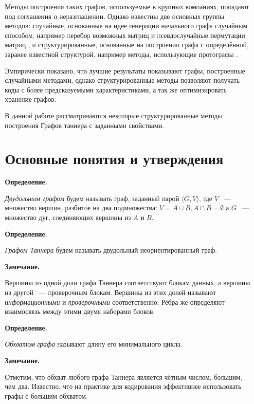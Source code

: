 \documentclass[14pt]{mmcs-article}
\begin{document}
Методы построения таких графов, используемые в крупных компаниях, попадают под соглашения о неразглашении. Однако известны две основных группы методов: случайные, основанные на идее генерации начального графа случайным способом, например перебор возможных матриц \cite{bruteforce} и псевдослучайные пермутации матриц \cite{gallager}, и структурированные, основанные на построении графа с определённой, заранее известной структурой, например методы, использующие протографы \cite{protographs}.

Эмпирически показано, что лучшие результаты показывают графы, построенные случайными методами, однако структурированные методы позволяют получать коды с более предсказуемыми характеристиками, а так же оптимизировать хранение графов. 

В данной работе рассматриваются некоторые структурированные методы построения Графов таннера с заданными свойствами.

\newpage
\section{Основные понятия и утверждения}\label{dsfs}

\textbf{Определение.}

\textsl{Двудольным графом} будем называть граф, заданный парой $\langle G, V \rangle$, где $V$ ~--- множество вершин, разбитое на два подмножества: $V = A \cup B, A \cap B = \emptyset$ а $G$ ~--- множество дуг, соединяющих вершины из $A$ и $B$.

\textbf{Определение.}

\textsl{Графом Таннера} будем называть двудольный неориентированный граф.

\textbf{Замечание.}

Вершины из одной доли графа Таннера соответствуют блокам данных, а вершины из другой ~--- проверочным блокам. Вершины из этих долей называют \textsl{информационными} и \textsl{проверочными} соответственно. Рёбра же определяют взаимосвязь между этими двумя наборами блоков.

\textbf{Определение.}

\textsl{Обхватом графа} называют длину его минимального цикла.

\textbf{Замечание.}

Отметим, что обхват любого графа Таннера является чётным числом, большим, чем два. Известно, что на практике для кодирования эффективнее использовать графы с большим обхватом.
\end{document}

